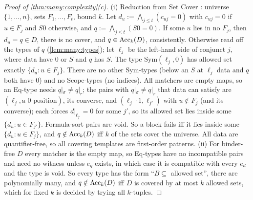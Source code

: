 \begin{proof}[Proof of \cref{thm:many:complexity}(c)]
(i) Reduction from Set Cover \citep{karp1972reducibility}: universe $\{1,\dots,n\}$, sets $F_1,\dots,F_t$, bound $k$. Let
$d_u:=\bigwedge_{j\le t}(c_{uj}=0)$ with $c_{uj}=0$ if $u\in F_j$ and $S0$ otherwise, and $q:=\bigwedge_{j\le t}(S0=0)$. If some $u$
lies in no $F_j$, then $d_u=q\in D$, there is no cover, and $q\in\mathrm{Acc}_k(D)$, consistently. Otherwise read off the types of $q$
(\cref{lem:many:types}); let $\ell_j$ be the left-hand side of conjunct $j$, where data have $0$ or $S$ and $q$ has $S$. The
type $\mathrm{Sym}(\ell_j,0)$ has allowed set exactly $\{d_u:u\in F_j\}$. There are no other Sym-types (below an $S$ at
$\ell_j$ data and $q$ both have $0$) and no Scope-types (no indices). All matchers are empty maps, so an Eq-type needs
$q|_\sigma\neq q|_r$; the pairs with $q|_\sigma\neq q|_r$ that data can satisfy are $(\ell_j,\text{a }0\text{-position})$, its
converse, and $(\ell_j\cdot1,\ell_{j'})$ with $u\notin F_j$ (and its converse); each forces $d|_{\ell_{j'}}=0$ for some $j'$, so its
allowed set lies inside some $\{d_u:u\in F_{j'}\}$. Formula-sort pairs are void. So a block fails iff it lies inside some
$\{d_u:u\in F_j\}$, and $q\notin\mathrm{Acc}_k(D)$ iff $k$ of the sets cover the universe. All data are quantifier-free, so all covering
templates are first-order patterns.
(ii) For binder-free $D$ every matcher is the empty map, so Eq-types have no incompatible pairs and need no witness unless
$e_q$ exists, in which case it is compatible with every $e_d$ and the type is void. So every type has the form
``$B\subseteq$ allowed set'', there are polynomially many, and $q\notin\mathrm{Acc}_k(D)$ iff $D$ is covered by at most $k$ allowed sets,
which for fixed $k$ is decided by trying all $k$-tuples.
\end{proof}

